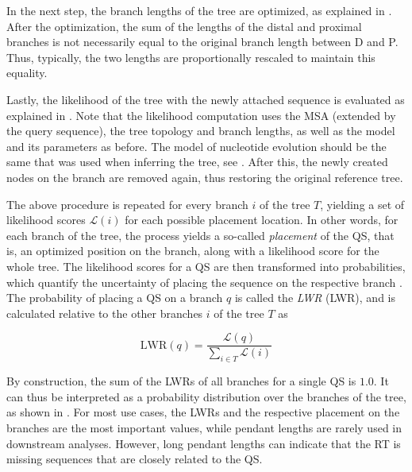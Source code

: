 In the next step, the branch lengths of the tree are optimized,
as explained in .
After the optimization, the sum of the lengths of the distal and proximal branches is not necessarily equal
to the original branch length between {\sffamily D} and {\sffamily P}.
Thus, typically, the two lengths are proportionally rescaled to maintain this equality.

Lastly, the likelihood of the tree with the newly attached sequence is evaluated
as explained in .
Note that the likelihood computation uses the MSA (extended by the query sequence),
the tree topology and branch lengths, as well as the model and its parameters as before.
The model of nucleotide evolution should be the same that was used when inferring the tree,
see .
After this, the newly created nodes on the branch are removed again, thus restoring the original reference tree.

The above procedure is repeated for every branch $i$ of the tree $T$,
yielding a set of likelihood scores $\mathcal{L}(i)$ for each possible placement location.
In other words, for each branch of the tree, the process yields a so-called \emph{placement} of the \ac{QS},
that is, an optimized position on the branch, along with a likelihood score for the whole tree.
The likelihood scores for a \ac{QS} are then transformed into probabilities,
which quantify the uncertainty of placing the sequence on the respective branch \cite{Strimmer2002,VonMering2007}.
The probability of placing a \ac{QS} on a branch $q$ is called the \emph{\acl{LWR}} (\acs{LWR}),
and is calculated relative to the other branches $i$ of the tree $T$ as

\begin{equation}
    \label{ch:Foundations:sec:PhylogeneticPlacement:eq:LWR}
    \mbox{LWR}(q) =  \frac{ \mathcal{L}( q )}{ \sum_{i \in T} \mathcal{L}( i )}
\end{equation}

By construction, the sum of the \acp{LWR} of all branches for a single \ac{QS} is $1.0$.
It can thus be interpreted as a probability distribution over the branches of the tree,
as shown in .
For most use cases, the \acp{LWR} and the respective placement on the branches are the most important values,
while pendant lengths are rarely used in downstream analyses.
However, long pendant lengths can indicate that the \ac{RT} is missing sequences that are closely related to the \ac{QS}.

